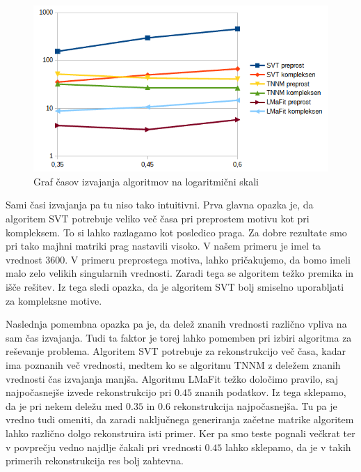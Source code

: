 \begin{figure}[!ht]
    \centering
    \includegraphics[width=\linewidth]{Poglavja/Slike/kompleksnost/kompleksna grayscale 300/cas.png}
    \caption{Graf časov izvajanja algoritmov na logaritmični skali}
\end{figure}
Sami časi izvajanja pa tu niso tako intuitivni. Prva glavna opazka je, da algoritem SVT potrebuje veliko več časa pri preprostem motivu kot pri kompleksem.  To si lahko razlagamo kot posledico praga. Za dobre rezultate smo pri tako majhni matriki prag nastavili visoko. V našem primeru je imel ta vrednost $3600$. V primeru preprostega motiva, lahko pričakujemo, da bomo imeli malo zelo velikih singularnih vrednosti. Zaradi tega se algoritem težko premika in išče rešitev. Iz tega sledi opazka, da je algoritem SVT bolj smiselno uporabljati za kompleksne motive.

Naslednja pomembna opazka pa je, da delež znanih vrednosti različno vpliva na sam čas izvajanja. Tudi ta faktor je torej lahko pomemben pri izbiri algoritma za reševanje problema. Algoritem SVT potrebuje za rekonstrukcijo več časa, kadar ima poznanih več vrednosti, medtem ko se algoritmu TNNM z deležem znanih vrednosti čas izvajanja manjša. Algoritmu LMaFit težko določimo pravilo, saj najpočasnejše izvede rekonstrukcijo pri $0.45$ znanih podatkov. Iz tega sklepamo, da je pri nekem deležu med $0.35$ in $0.6$ rekonstrukcija najpočasnejša. Tu pa je vredno tudi omeniti, da zaradi naključnega generiranja začetne matrike algoritem lahko različno dolgo rekonstruira isti primer.  Ker pa smo teste pognali večkrat ter v povprečju vedno najdlje čakali pri vrednosti $0.45$ lahko sklepamo, da je v takih primerih rekonstrukcija res bolj zahtevna.

